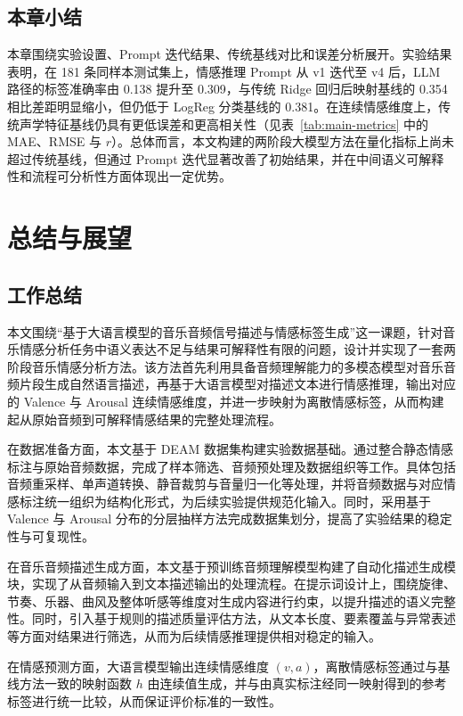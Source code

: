 \subsection{本章小结}

本章围绕实验设置、Prompt 迭代结果、传统基线对比和误差分析展开。实验结果表明，在 181 条同样本测试集上，情感推理 Prompt 从 v1 迭代至 v4 后，LLM 路径的标签准确率由 0.138 提升至 0.309，与传统 Ridge 回归后映射基线的 0.354 相比差距明显缩小，但仍低于 LogReg 分类基线的 0.381。在连续情感维度上，传统声学特征基线仍具有更低误差和更高相关性（见表~\ref{tab:main-metrics} 中的 MAE、RMSE 与 $r$）。总体而言，本文构建的两阶段大模型方法在量化指标上尚未超过传统基线，但通过 Prompt 迭代显著改善了初始结果，并在中间语义可解释性和流程可分析性方面体现出一定优势。

\newpage
\section{总结与展望}

\subsection{工作总结}

本文围绕“基于大语言模型的音乐音频信号描述与情感标签生成”这一课题，针对音乐情感分析任务中语义表达不足与结果可解释性有限的问题，设计并实现了一套两阶段音乐情感分析方法。该方法首先利用具备音频理解能力的多模态模型对音乐音频片段生成自然语言描述，再基于大语言模型对描述文本进行情感推理，输出对应的 Valence 与 Arousal 连续情感维度，并进一步映射为离散情感标签，从而构建起从原始音频到可解释情感结果的完整处理流程。

在数据准备方面，本文基于 DEAM 数据集构建实验数据基础。通过整合静态情感标注与原始音频数据，完成了样本筛选、音频预处理及数据组织等工作。具体包括音频重采样、单声道转换、静音裁剪与音量归一化等处理，并将音频数据与对应情感标注统一组织为结构化形式，为后续实验提供规范化输入。同时，采用基于 Valence 与 Arousal 分布的分层抽样方法完成数据集划分，提高了实验结果的稳定性与可复现性。

在音乐音频描述生成方面，本文基于预训练音频理解模型构建了自动化描述生成模块，实现了从音频输入到文本描述输出的处理流程。在提示词设计上，围绕旋律、节奏、乐器、曲风及整体听感等维度对生成内容进行约束，以提升描述的语义完整性。同时，引入基于规则的描述质量评估方法，从文本长度、要素覆盖与异常表述等方面对结果进行筛选，从而为后续情感推理提供相对稳定的输入。

在情感预测方面，大语言模型输出连续情感维度 $(v,a)$，离散情感标签通过与基线方法一致的映射函数 $h$ 由连续值生成，并与由真实标注经同一映射得到的参考标签进行统一比较，从而保证评价标准的一致性。

